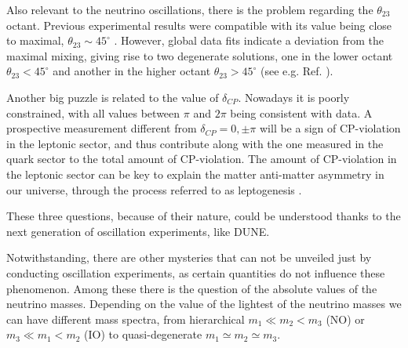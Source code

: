 Also relevant to the neutrino oscillations, there is the problem regarding the $\theta_{23}$ octant. Previous experimental results were compatible with its value being close to maximal, $\theta_{23} \sim 45^{\circ}$ \cite{T2K2015,NOvA2016}. However, global data fits indicate a deviation from the maximal mixing, giving rise to two degenerate solutions, one in the lower octant $\theta_{23} < 45^{\circ}$ and another in the higher octant $\theta_{23} > 45^{\circ}$ (see e.g. Ref. \cite{deSalas2020}).

Another big puzzle is related to the value of $\delta_{CP}$. Nowadays it is poorly constrained, with all values between $\pi$ and $2\pi$ being consistent with data. A prospective measurement different from $\delta_{CP}=0,\pm\pi$ will be a sign of CP-violation in the leptonic sector, and thus contribute along with the one measured in the quark sector to the total amount of CP-violation. The amount of CP-violation in the leptonic sector can be key to explain the matter anti-matter asymmetry in our universe, through the process referred to as leptogenesis \cite{Davidson2008}.

These three questions, because of their nature, could be understood thanks to the next generation of oscillation experiments, like DUNE.

Notwithstanding, there are other mysteries that can not be unveiled just by conducting oscillation experiments, as certain quantities do not influence these phenomenon. Among these there is the question of the absolute values of the neutrino masses. Depending on the value of the lightest of the neutrino masses we can have different mass spectra, from hierarchical $m_{1} \ll m_{2}<m_{3}$ (NO) or $m_{3} \ll m_{1}<m_{2}$ (IO) to quasi-degenerate $m_{1} \simeq m_{2} \simeq m_{3}$.

